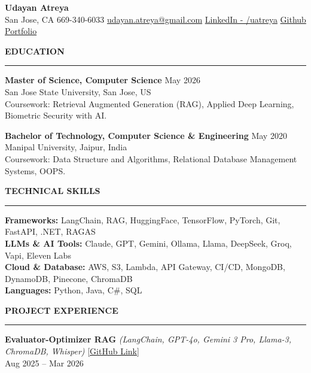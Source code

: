 \documentclass[letterpaper,10.5pt]{extarticle}
\newcommand{\resumesection}[1]{%
    \vspace{6pt}%
    \noindent\textbf{#1}\vspace{-5pt}%
    \\\noindent\rule{\textwidth}{0.5pt}%
    \vspace{1pt}%
}
\begin{document}
\begin{center}
    {\LARGE\textbf{Udayan Atreya}}\\[3pt]
    {\fontsize{11}{13.2}\selectfont
    San Jose, CA \textbar{} 669-340-6033 \textbar{}
    \href{mailto:udayan.atreya@gmail.com}{udayan.atreya@gmail.com} \textbar{}
    \href{https://www.linkedin.com/in/uatreya/}{LinkedIn - /uatreya} \textbar{}
    \href{https://github.com/slowloris-98/}{Github} \textbar{}
    \href{https://udayan-atreya.vercel.app/}{Portfolio}}
\end{center}

\resumesection{EDUCATION}

\noindent\textbf{Master of Science, Computer Science} \hfill May 2026\\
San Jose State University, San Jose, US\\
Coursework: Retrieval Augmented Generation (RAG), Applied Deep Learning, Biometric Security with AI.

\vspace{5pt}

\noindent\textbf{Bachelor of Technology, Computer Science \& Engineering} \hfill May 2020\\
Manipal University, Jaipur, India\\
Coursework: Data Structure and Algorithms, Relational Database Management Systems, OOPS.

\resumesection{TECHNICAL SKILLS}

\noindent\textbf{Frameworks:} LangChain, RAG, HuggingFace, TensorFlow, PyTorch, Git, FastAPI, .NET, RAGAS\\
\noindent\textbf{LLMs \& AI Tools:} Claude, GPT, Gemini, Ollama, Llama, DeepSeek, Groq, Vapi, Eleven Labs\\
\noindent\textbf{Cloud \& Database:} AWS, S3, Lambda, API Gateway, CI/CD, MongoDB, DynamoDB, Pinecone, ChromaDB\\
\noindent\textbf{Languages:} Python, Java, C\#, SQL

\resumesection{PROJECT EXPERIENCE}

\noindent\textbf{Evaluator-Optimizer RAG}
\textit{(LangChain, GPT-4o, Gemini 3 Pro, Llama-3, ChromaDB, Whisper)} \hfill \href{https://github.com/slowloris-98/Evaluator-Optimizer-RAG}{[GitHub Link]} \\
Aug 2025 -- Mar 2026 
\end{document}
